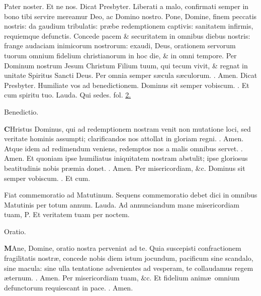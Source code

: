 \documentclass[letter,11pt]{book}
\makeatletter
\DeclareRobustCommand{\Rbar}{\vers@resp{0pt}{R}}
\newcommand{\vers@resp@sym}{\raisebox{0.2ex}{\rotatebox[origin=c]{-20}{$\m@th\rceil$}}}
\newcommand{\vers@resp}[2]{%
  {\ooalign{\hidewidth\kern#1\vers@resp@sym\hidewidth\cr#2\cr}}%
}%
\def\P{\color{Red} P. \color{black}}
\def\R{\color{Red} \Rbar . \color{black}}
\makeatother
\begin{document}
\begin{multicols}{2}
\newline \indent Pater noster. Et ne nos.
\newline \color{Red} Dicat Presbyter. \color{black} Liberati a malo, confirmati semper in bono tibi servire mereamur Deo, ac Domino nostro. Pone, Domine, finem peccatis nostris: da gaudium tribulatis: pr\ae be redemptionem captivis: sanitatem infirmis, requiemque defunctis.
Concede pacem \& securitatem in omnibus diebus nostris: frange audaciam inimicorum nostrorum: exaudi, Deus, orationem servorum tuorum omnium fidelium christianorum in hoc die, \& in omni tempore. Per Dominum nostrum Jesum Christum Filium tuum, qui tecum vivit, \& regnat in unitate Spiritus Sancti Deus. Per omnia semper s\ae cula s\ae culorum. \R Amen.
\newline \color{Red} Dicat Presbyter. \color{black} Humiliate vos ad benedictionem. Dominus sit semper vobiscum. \R Et cum spiritu tuo.
\newline \color{Red} Lauda. \color{black} Qui sedes. \color{Red} fol. \color{black} \hyperlink{Lauda}{2.}
\vspace{-.75em} \begin{center} \color{Red} Benedictio. \end{center} \vspace{-.75em}
\lettrine[lines=2]{\bfseries \color{Red} C}{}Hristus Dominus, qui ad redemptionem nostram venit non mutatione loci, sed veritate hominis assumpti; clarificandos nos attollat in gloriam regni. \R Amen. Atque idem ad redimendum veniens, redemptos nos a malis omnibus servet. \R Amen. Et quoniam ipse humiliatus iniquitatem nostram abstulit; ipse gloriosus beatitudinis nobis pr\ae mia donet. \R Amen. Per misericordiam, \&c. Dominus sit semper vobiscum. \R Et cum.
\par \color{Red} Fiat commemoratio ad Matutinum. Sequens commemoratio debet dici in omnibus Matutinis per totum annum. \color{black}
\newline \color{Red} Lauda. \color{black} Ad annunciandum mane misericordiam tuam, \P Et veritatem tuam per noctem.
\vspace{-.75em} \begin{center} \color{Red} Oratio. \end{center} \vspace{-.75em}
\lettrine[lines=2]{\bfseries \color{Red} M}{}Ane, Domine, oratio nostra perveniat ad te. Quia suscepisti confractionem fragilitatis nostr\ae , concede nobis diem istum jocundum, pacificum sine
scandalo, sine macula: sine ulla tentatione advenientes ad vesperam, te collaudamus regem \ae ternum. \R Amen. Per misericordiam tuam, \&c. Et fidelium anim\ae \ omnium defunctorum requiescant in pace. \R Amen.

\end{multicols}
\end{document}
